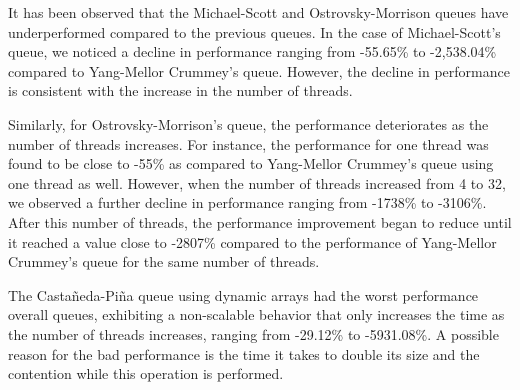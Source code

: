 %


It has been observed that the Michael-Scott and Ostrovsky-Morrison queues have underperformed compared to the previous queues. In the case of Michael-Scott's queue, we noticed a decline in performance ranging from -55.65\% to -2,538.04\% compared to Yang-Mellor Crummey's queue. However, the decline in performance is consistent with the increase in the number of threads.

Similarly, for Ostrovsky-Morrison's queue, the performance deteriorates as the number of threads increases. For instance, the performance for one thread was found to be close to -55\% as compared to Yang-Mellor Crummey's queue using one thread as well. However, when the number of threads increased from 4 to 32, we observed a further decline in performance ranging from -1738\% to -3106\%. After this number of threads, the performance improvement began to reduce until it reached a value close to -2807\% compared to the performance of Yang-Mellor Crummey's queue for the same number of threads.

The Castañeda-Piña queue using dynamic arrays had the worst performance overall queues, exhibiting a non-scalable behavior that only increases the time as the number of threads increases, ranging from -29.12\% to -5931.08\%. A possible reason for the bad performance is the time it takes to double its size and the contention while this operation is performed.

